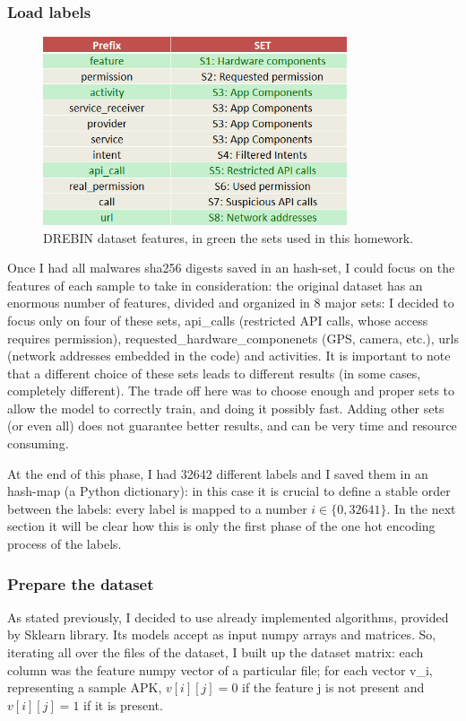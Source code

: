 \documentclass[12pt]{article}
\begin{document}
\subsubsection{Load labels}
\begin{figure}[!ht]
	\centering %
	\includegraphics[width=0.8\textwidth]{features.png} %
	\caption{DREBIN dataset features, in green the sets used in this homework.} 
	\label{fig:features}
\end{figure}
Once I had all malwares sha256 digests saved in an hash-set, I could focus on the features of each sample to take in consideration: the original dataset has an enormous number of features, divided and organized in 8 major sets: I decided to focus only on four of these sets, api\_calls (restricted API calls, whose access requires permission), requested\_hardware\_componenets (GPS, camera, etc.), urls (network addresses embedded in the code) and activities. It is important to note that a different choice of these sets leads to different results (in some cases, completely different). The trade off here was to choose enough and proper sets to allow the model to correctly train, and doing it possibly fast. Adding other sets (or even all) does not guarantee better results, and can be very time and resource consuming.

At the end of this phase, I had 32642 different labels and I saved them in an hash-map (a Python dictionary): in this case it is crucial to define a stable order between the labels: every label is mapped to a number $i \in \{0, 32641\}$.
In the next section it will be clear how this is only the first phase of the one hot encoding process of the labels.

\subsubsection{Prepare the dataset}
As stated previously, I decided to use already implemented algorithms, provided by Sklearn library. Its models accept as input numpy arrays and matrices. So, iterating all over the files of the dataset, I built up the dataset matrix: each column was the feature numpy vector of a particular file; for each vector v\_i, representing a sample APK, $v[i][j] = 0$ if the feature j is not present and $v[i][j] = 1$ if it is present.
\end{document}
